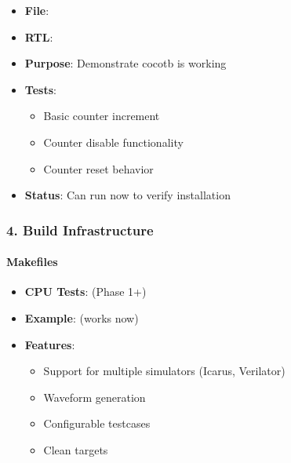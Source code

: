\begin{record}

\begin{itemize}
\tightlist
\item
  \textbf{File}: 
\item
  \textbf{RTL}: 
\item
  \textbf{Purpose}: Demonstrate cocotb is working
\item
  \textbf{Tests}:

  \begin{itemize}
  \tightlist
  \item
    Basic counter increment
  \item
    Counter disable functionality
  \item
    Counter reset behavior
  \end{itemize}
\item
  \textbf{Status}: \ok{} Can run now to verify installation
\end{itemize}

\end{record}

\subsubsection{4. Build Infrastructure}\label{cr:app:archive-cocotb-setup-summary:4-build-infrastructure}

\paragraph{Makefiles}\label{cr:app:archive-cocotb-setup-summary:makefiles}

\begin{record}

\begin{itemize}
\tightlist
\item
  \textbf{CPU Tests}:  (Phase 1+)
\item
  \textbf{Example}:  (works now)
\item
  \textbf{Features}:

  \begin{itemize}
  \tightlist
  \item
    Support for multiple simulators (Icarus, Verilator)
  \item
    Waveform generation
  \item
    Configurable testcases
  \item
    Clean targets
  \end{itemize}
\end{itemize}

\end{record}

